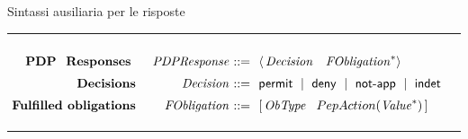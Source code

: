 \begin{table}[h]
\footnotesize

\caption{Sintassi ausiliaria per le risposte}
\hrule
$
\begin{array}{@{\ }r@{\ \ \ \ }r@{\ }r@{\ \ }l@{\ }}

&&&\\[-.2cm]
{\textbf{PDP \ Responses }} &
\mathit{PDPResponse} & ::= & \langle \,\mathit{Decision} \ \ \ \mathit{FObligation}^* \rangle
\\[.2cm]
{\textbf{Decisions}} &
\mathit{Decision} & ::= & \permit \Sep \deny \Sep \notApp \Sep \indet
\\[.2cm]
{\textbf{Fulfilled obligations}} &
\mathit{FObligation} & ::= &  [ \, \mathit{ObType} \ \ \obl{\mathit{Value}} \, ]\\[.1cm]

\end{array}
$\\
\hrule
\label{tab:facpl_context_syntax}
\end{table}
